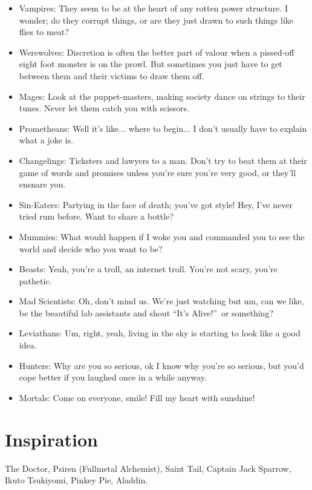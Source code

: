 \begin{itemize}
\item Vampires: They seem to be at the heart of any rotten power structure. I wonder; do they corrupt things, or are they just drawn to such things like flies to meat?
\item Werewolves: Discretion is often the better part of valour when a pissed-off eight foot monster is on the prowl. But sometimes you just have to get between them and their victims to draw them off.
\item Mages: Look at the puppet-masters, making society dance on strings to their tunes. Never let them catch you with scissors.
\item Prometheans: Well it's like... where to begin... I don't usually have to explain what a joke is.
\item Changelings: Ticksters and lawyers to a man. Don’t try to beat them at their game of words and promises unless you’re sure you’re very good, or they’ll ensnare you.
\item Sin-Eaters: Partying in the face of death; you've got style! Hey, I've never tried rum before. Want to share a bottle?
\item Mummies: What would happen if I woke you and commanded you to see the world and decide who you want to be? 
\item Beasts: Yeah, you're a troll, an internet troll. You're not scary, you're pathetic.
\item Mad Scientists: Oh, don't mind us. We're just watching but um, can we like, be the beautiful lab assistants and shout \textquotedblleft It's Alive!\textquotedblright\, or something?
\item Leviathans: Um, right, yeah, living in the sky is starting to look like a good idea.
\item Hunters: Why are you so serious, ok I know why you're so serious, but you'd cope better if you laughed once in a while anyway.
\item Mortals: Come on everyone, smile! Fill my heart with sunshine!

\end{itemize}

\section*{Inspiration}
The Doctor, Psiren (Fullmetal Alchemist), Saint Tail, Captain Jack Sparrow, Ikuto Tsukiyomi, Pinkey Pie, Aladdin. 

\newpage{}

